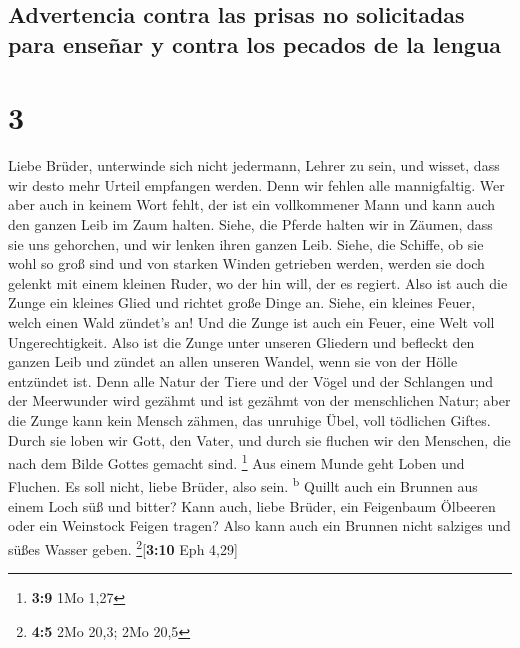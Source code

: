 \hypertarget{advertencia-contra-las-prisas-no-solicitadas-para-enseuxf1ar-y-contra-los-pecados-de-la-lengua}{%
\subsection{Advertencia contra las prisas no solicitadas para enseñar y
contra los pecados de la
lengua}\label{advertencia-contra-las-prisas-no-solicitadas-para-enseuxf1ar-y-contra-los-pecados-de-la-lengua}}

\hypertarget{section-2}{%
\section{3}\label{section-2}}

 Liebe Brüder, unterwinde sich nicht jedermann, Lehrer zu
sein, und wisset, dass wir desto mehr Urteil empfangen werden.
 Denn wir fehlen alle mannigfaltig. Wer aber auch in
keinem Wort fehlt, der ist ein vollkommener Mann und kann auch den
ganzen Leib im Zaum halten.  Siehe, die Pferde halten wir
in Zäumen, dass sie uns gehorchen, und wir lenken ihren ganzen Leib.
 Siehe, die Schiffe, ob sie wohl so groß sind und von
starken Winden getrieben werden, werden sie doch gelenkt mit einem
kleinen Ruder, wo der hin will, der es regiert.  Also ist
auch die Zunge ein kleines Glied und richtet große Dinge an. Siehe, ein
kleines Feuer, welch einen Wald zündet's an!  Und die
Zunge ist auch ein Feuer, eine Welt voll Ungerechtigkeit. Also ist die
Zunge unter unseren Gliedern und befleckt den ganzen Leib und zündet an
allen unseren Wandel, wenn sie von der Hölle entzündet ist.
 Denn alle Natur der Tiere und der Vögel und der Schlangen
und der Meerwunder wird gezähmt und ist gezähmt von der menschlichen
Natur;  aber die Zunge kann kein Mensch zähmen, das
unruhige Übel, voll tödlichen Giftes.  Durch sie loben wir
Gott, den Vater, und durch sie fluchen wir den Menschen, die nach dem
Bilde Gottes gemacht sind. \footnote{\textbf{3:9} 1Mo 1,27}
 Aus einem Munde geht Loben und Fluchen. Es soll nicht,
liebe Brüder, also sein. \textsuperscript{b}  Quillt auch
ein Brunnen aus einem Loch süß und bitter?  Kann auch,
liebe Brüder, ein Feigenbaum Ölbeeren oder ein Weinstock Feigen tragen?
Also kann auch ein Brunnen nicht salziges und süßes Wasser geben.
\footnote{\textbf{4:5} 2Mo 20,3; 2Mo 20,5}{[}\textbf{3:10} Eph 4,29{]}

